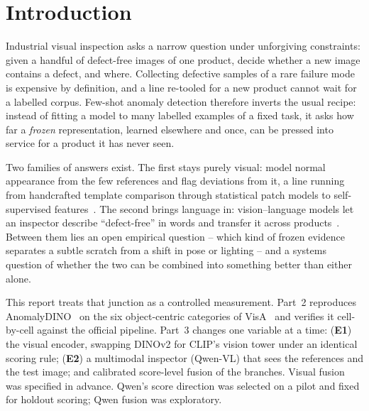 \section{Introduction}
\label{sec:intro}

Industrial visual inspection asks a narrow question under unforgiving constraints: given a
handful of defect-free images of one product, decide whether a new image contains a defect,
and where. Collecting defective samples of a rare failure mode is expensive by definition,
and a line re-tooled for a new product cannot wait for a labelled corpus. Few-shot anomaly
detection therefore inverts the usual recipe: instead of fitting a model to many labelled
examples of a fixed task, it asks how far a \emph{frozen} representation, learned elsewhere
and once, can be pressed into service for a product it has never seen.

Two families of answers exist. The first stays purely visual: model normal appearance from
the few references and flag deviations from it, a line running from handcrafted template
comparison through statistical patch models to self-supervised
features~\cite{bergmann2019mvtec,defard2021padim,roth2022patchcore,oquab2024dinov2,damm2025anomalydino}.
The second brings language in: vision--language models let an inspector describe
``defect-free'' in words and transfer it across
products~\cite{radford2021clip,jeong2023winclip,zhou2024anomalyclip}. Between them lies an
open empirical question -- which kind of frozen evidence separates a subtle scratch from a
shift in pose or lighting -- and a systems question of whether the two can be combined into
something better than either alone.

This report treats that junction as a controlled measurement. Part~2 reproduces
AnomalyDINO~\cite{damm2025anomalydino} on the six object-centric categories of
VisA~\cite{zou2022spot} and verifies it cell-by-cell against the official pipeline. Part~3
changes one variable at a time: (\textbf{E1}) the visual encoder, swapping DINOv2 for CLIP's
vision tower under an identical scoring rule; (\textbf{E2}) a multimodal inspector (Qwen-VL)
that sees the references and the test image; and calibrated score-level fusion of the
branches. Visual fusion was specified in advance. Qwen's score direction was selected on
a pilot and fixed for holdout scoring; Qwen fusion was exploratory.

